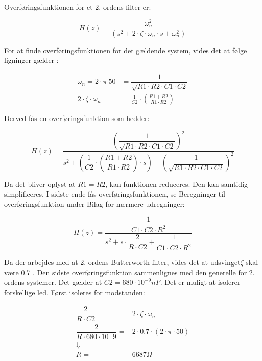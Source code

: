 Overføringsfunktionen for et 2. ordens filter er:
\begin{ceqn}
\begin{equation}
H(z)=\frac{\omega_n^2}{(s^2 + 2\cdot\zeta \cdot \omega_n \cdot s+\omega_n^2)}
\end{equation}
\end{ceqn}

For at finde overføringsfunktionen for det gældende system, vides det at følge ligninger gælder \cite{Wikilavpas}:
\begin{ceqn} 
\begin{equation}
\begin{split}
\omega_n = 2\cdot \pi\ 50 &= \dfrac{1}{\sqrt{R1\cdot R2\cdot C1\cdot C2}}\\
2\cdot \zeta\cdot\omega_n& =\frac{1}{C2}\cdot \left( \frac{R1+R2}{R1\cdot R2}\right)
\end{split}
\end{equation}
\end{ceqn}
Derved fås en overføringsfunktion som hedder: 
\begin{ceqn}
\begin{equation}
H(z)=\frac{\left(\dfrac{1}{\sqrt{R1\cdot R2 \cdot C1\cdot C2}}\right)^2}{s^2+ \left( \dfrac{1}{C2} \cdot \left( \dfrac{R1+R2}{R1\cdot R2}\right) \cdot s \right) +\left( \dfrac{1}{\sqrt{R1\cdot R2 \cdot C1\cdot C2}}\right)^2 }
\end{equation}
\end{ceqn}
Da det bliver oplyst at $ R1=R2 $, kan funktionen reduceres. Den kan samtidig simplificeres. I sidste ende fås overføringsfunktionen, se Beregninger til overføringsfunktion under Bilag for nærmere udregninger:
\begin{ceqn}
\begin{equation}
H(z)=\dfrac{\dfrac{1}{C1 \cdot C2\cdot R^2}}{s^2+s\cdot \dfrac{2}{R\cdot C2}+ \dfrac{1}{C1\cdot C2\cdot R^2}}
\end{equation}
\end{ceqn}
Da der arbejdes med at 2. ordens Butterworth filter, vides det at udsvinget$ \zeta $ skal være 0.7 \cite{ASB}. 
Den sidste overføringsfunktion sammenlignes med den generelle for 2. ordens systemer. Det gælder at $ C2 = 680\cdot 10^{-9} nF $. Det er muligt at isolerer forskellige led. Først isoleres for modstanden:
\begin{ceqn}
\begin{equation}
\begin{split}
\dfrac{2}{R\cdot C2}=& 2\cdot \zeta \cdot \omega_n\\
\dfrac{2}{R\cdot 680\cdot 10^-9}=&2\cdot 0.7 \cdot(2\cdot\pi\cdot 50)\\
\Downarrow\\
 R=& 6687 \Omega
\end{split}
\end{equation}
\end{ceqn}
